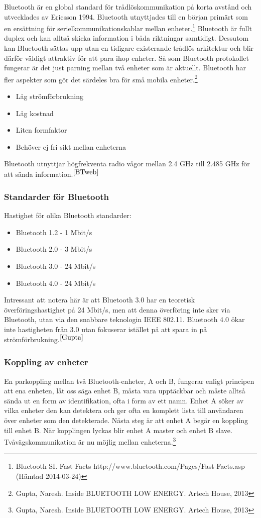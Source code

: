 \documentclass[a4paper,12pt,fleqn]{article}
\begin{document}
Bluetooth är en global standard för trådlöskommunikation på korta avstånd och utvecklades av Ericsson 1994. Bluetooth utnyttjades till en början primärt som en ersättning för serielkommunikationskablar mellan enheter.\footnote{\label{BTweb}Bluetooth SI. Fast Facts http://www.bluetooth.com/Pages/Fast-Facts.asp (Hämtad 2014-03-24)}
Bluetooth är fullt duplex och kan alltså skicka information i båda riktningar samtidigt. Dessutom kan Bluetooth sättas upp utan en tidigare existerande trådlös arkitektur och blir därför väldigt attraktiv för att para ihop enheter. Så som Bluetooth protokollet fungerar är det just parning mellan två enheter som är aktuellt. Bluetooth har fler aspekter som gör det särdeles bra för små mobila enheter.\footnote{\label{Gupta}Gupta, Naresh. Inside BLUETOOTH LOW ENERGY. Artech House, 2013}
\begin{itemize}
\item Låg strömförbrukning 
\item Låg kostnad
\item Liten formfaktor
\item Behöver ej fri sikt mellan enheterna
\end{itemize}

Bluetooth utnyttjar högfrekventa radio vågor mellan 2.4 GHz till 2.485 GHz för att sända information.$^{\ref{BTweb}}$

\subsubsection{Standarder för Bluetooth}
Hastighet för olika Bluetooth standarder:
\begin{itemize}
\item Bluetooth 1.2 - 1 Mbit/s 
\item Bluetooth 2.0 - 3 Mbit/s
\item Bluetooth 3.0 - 24 Mbit/s
\item Bluetooth 4.0 - 24 Mbit/s
\end{itemize}

Intressant att notera här är att Bluetooth 3.0 har en teoretisk överföringshastighet på 24 Mbit/s, men att denna överföring inte sker via Bluetooth, utan via den snabbare teknologin IEEE 802.11. 
Bluetooth 4.0 ökar inte hastigheten från 3.0 utan fokuserar istället på att spara in på strömförbrukning.$^{\ref{Gupta}}$


\subsubsection{Koppling av enheter}
En parkoppling mellan två Bluetooth-enheter, A och B, fungerar enligt principen att ena enheten, låt oss säga enhet B, måsta vara upptäckbar och måste alltså sända ut en form av identifikation, ofta i form av ett namn. Enhet A söker av vilka enheter den kan detektera och ger ofta en komplett lista till användaren över enheter som den detekterade. Nästa steg är att enhet A begär en koppling till enhet B. När kopplingen lyckas blir enhet A master och enhet B slave. Tvåvägskommunikation är nu möjlig mellan enheterna.\footnote{\label{Gupta2}Gupta, Naresh. Inside BLUETOOTH LOW ENERGY. Artech House, 2013}
\end{document}
